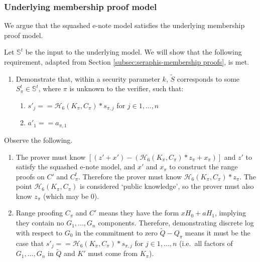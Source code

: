 \begin{appendices}
\subsubsection{Underlying membership proof model}

We argue that the squashed e-note model satisfies the underlying membership proof model.

Let $\mathbb{S}^t$ be the input to the underlying model. We will show that the following requirement, adapted from Section \ref{subsec:seraphis-membership proofs}, is met.

\begin{enumerate}
    \item Demonstrate that, within a security parameter $k$, $\tilde{S}$ corresponds to some $S^t_{\pi} \in \mathbb{S}^t$, where $\pi$ is unknown to the verifier, such that:
    \begin{enumerate}
        \item $s'_j == \mathcal{H}_6(K_{\pi}, C_{\pi})*s_{\pi,j}$ for $j \in 1,...,n$
        \item $a'_1 == a_{\pi,1}$
    \end{enumerate}
\end{enumerate}

Observe the following.

\begin{enumerate}
    \item The prover must know $[(z' + x') - (\mathcal{H}_6(K_{\pi}, C_{\pi})*z_{\pi} + x_{\pi})]$ and $z'$ to satisfy the squashed e-note model, and $x'$ and $x_{\pi}$ to construct the range proofs on $C'$ and $C^t_{\pi}$. Therefore the prover must know $\mathcal{H}_6(K_{\pi}, C_{\pi})*z_{\pi}$. The point $\mathcal{H}_6(K_{\pi}, C_{\pi})$ is considered `public knowledge', so the prover must also know $z_{\pi}$ (which may be 0).

    \item Range proofing $C_{\pi}$ and $C'$ means they have the form $x H_0 + a H_1$, implying they contain no $G_1,...,G_n$ components. Therefore, demonstrating discrete log with respect to $G_0$ in the commitment to zero $\tilde{Q} - Q_{\pi}$ means it must be the case that $s'_j == \mathcal{H}_6(K_{\pi}, C_{\pi})*s_{\pi,j}$ for $j \in 1,...,n$ (i.e.\ all factors of $G_1,...,G_n$ in $\tilde{Q}$ and $K'$ must come from $K_{\pi}$).


\end{enumerate}
\end{appendices}
